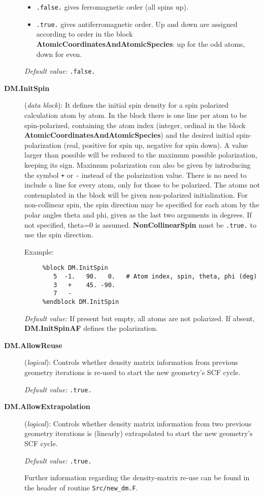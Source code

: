 \documentclass[11pt]{article}
\begin{document}
\begin{description}
\begin{itemize}
\item {\tt .false.} gives ferromagnetic order (all spins up).
\item {\tt .true.} gives antiferromagnetic order. Up and down are
assigned according to order in the block
{\bf AtomicCoordinatesAndAtomicSpecies}: up for the odd atoms, down for even.
\end{itemize}

{\it Default value:} {\tt .false.}


\item[{\bf DM.InitSpin}] ({\it data block}):
 It defines the
initial spin density for a spin polarized calculation atom by atom.
In the block there is one line per atom to be spin-polarized,
containing the atom index (integer, ordinal in the block
{\bf AtomicCoordinatesAndAtomicSpecies}) and the desired
initial spin-polarization (real, positive for spin up, negative for
spin down). A value larger than possible will be reduced
to the maximum possible polarization, keeping its sign.
Maximum polarization can also be given by introducing the
symbol {\tt +} or {\tt -} instead of the polarization value.
There is no need to include a line for every atom, only for
those to be polarized. The atoms not contemplated in the block will
be given non-polarized initialization.
For non-collinear spin, the spin direction may be specified for
each atom by the polar angles theta and phi, given as the last
two arguments in degrees. If not specified, theta=0 is assumed.
{\bf NonCollinearSpin} must be {\tt .true.} to use the spin direction.

Example:

\begin{verbatim}
     %block DM.InitSpin
        5  -1.   90.   0.   # Atom index, spin, theta, phi (deg)
        3   +    45. -90.
        7   -
     %endblock DM.InitSpin
\end{verbatim}

{\it Default value:} If present but empty, all atoms are not polarized.
If absent, {\bf DM.InitSpinAF} defines the polarization.

\item[{\bf DM.AllowReuse}] ({\it logical}):
Controls whether density matrix information from previous geometry
iterations is re-used to start the new geometry's SCF cycle.

{\it Default value:} {\tt .true.}

\item[{\bf DM.AllowExtrapolation}] ({\it logical}):
Controls whether density matrix information from two previous geometry
iterations is (linearly) extrapolated to start the new geometry's SCF cycle.

{\it Default value:} {\tt .true.}

Further information regarding the density-matrix re-use can be found
in the header of routine {\tt Src/new\_dm.F}.

\end{description}
\end{document}
